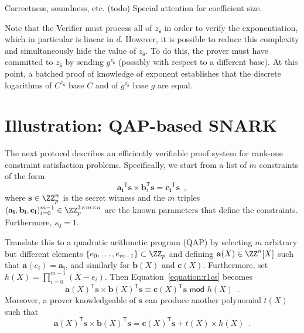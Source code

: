 \documentclass{article}
\theoremstyle{definition}
\begin{document}
Correctness, soundness, etc. (todo) Special attention for coefficient size.

Note that the Verifier must process all of $z_{\bar{\mathbf{s}}}$ in order to verify the exponentiation, which in particular is linear in $d$. However, it is possible to reduce this complexity and simultaneously hide the value of $z_{\bar{\mathbf{s}}}$. To do this, the prover must have committed to $z_{\bar{\mathbf{s}}}$ by sending $g^{z_{\bar{\mathbf{s}}}}$ (possibly with respect to a different base). At this point, a batched proof of knowledge of exponent establishes that the discrete logarithms of $C^{z_{\bar{\mathbf{s}}}}$ base $C$ and of $g^{z_{\bar{\mathbf{s}}}}$ base $g$ are equal.

\section{Illustration: QAP-based SNARK}

The next protocol describes an efficiently verifiable proof system for rank-one constraint satisfaction problems. Specifically, we start from a list of $m$ constraints of the form
\begin{equation} \label{equation:r1cs}
    \mathbf{a_i}^\mathsf{T} \mathbf{s} \times \mathbf{b}_i^\mathsf{T} \mathbf{s} = \mathbf{c_i}^\mathsf{T} \mathbf{s} \enspace ,
\end{equation}
where $\mathbf{s} \in \ZZ_p^n$ is the secret witness and the $m$ triples $(\mathbf{a_i}, \mathbf{b_i}, \mathbf{c_i})_{i=0}^{m-1} \in \ZZ_p^{3 \times m \times n}$ are the known parameters that define the constraints. Furthermore, $s_0 = 1$.

Translate this to a quadratic arithmetic program (QAP) by selecting $m$ arbitrary but different elements $\{e_0, \ldots, e_{m-1}\} \subset \ZZ_p$ and defining $\mathbf{a}(X) \in \ZZ^n[X]$ such that $\mathbf{a}(e_i) = \mathbf{a_i}$, and similarly for $\mathbf{b}(X)$ and $\mathbf{c}(X)$. Furthermore, set $h(X) = \prod_{i=0}^{m-1} (X-e_i)$. Then Equation~\ref{equation:r1cs} becomes
\begin{equation} \label{equation:qap_modular}
    \mathbf{a}(X)^\mathsf{T}\mathbf{s} \times \mathbf{b}(X)^\mathsf{T}\mathbf{s} \equiv \mathbf{c}(X)^\mathsf{T}\mathbf{s} \,\, \mathsf{mod} \,\, h(X) \enspace .
\end{equation}
Moreover, a prover knowledgeable of $\mathbf{s}$ can produce another polynomial $t(X)$ such that
\begin{equation} \label{equation:qap_explicit}
    \mathbf{a}(X)^\mathsf{T}\mathbf{s} \times \mathbf{b}(X)^\mathsf{T}\mathbf{s} = \mathbf{c}(X)^\mathsf{T}\mathbf{s} + t(X) \times h(X) \enspace .
\end{equation}
\end{document}
